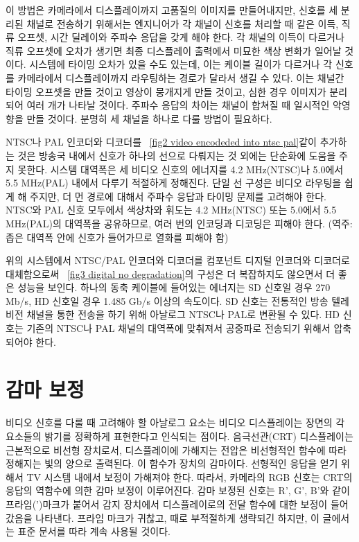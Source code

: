 이 방법은 카메라에서 디스플레이까지 고품질의 이미지를 만들어내지만, 신호를 세 분리된 채널로 전송하기 위해서는 엔지니어가 각 채널이 신호를 처리할 때 같은 이득, 직류 오프셋, 시간 딜레이와 주파수 응답을 갖게 해야 한다.
각 채널의 이득이 다르거나 직류 오프셋에 오차가 생기면 최종 디스플레이 출력에서 미묘한 색상 변화가 일어날 것이다.
시스템에 타이밍 오차가 있을 수도 있는데, 이는 케이블 길이가 다르거나 각 신호를 카메라에서 디스플레이까지 라우팅하는 경로가 달라서 생길 수 있다.
이는 채널간 타이밍 오프셋을 만들 것이고 영상이 뭉개지게 만들 것이고, 심한 경우 이미지가 분리되어 여러 개가 나타날 것이다.
주파수 응답의 차이는 채널이 합쳐질 때 일시적인 악영향을 만들 것이다.
분명히 세 채널을 하나로 다룰 방법이 필요하다.


NTSC나 PAL 인코더와 디코더를 \figurename~\ref{fig2 video encodeded into ntsc pal}\와 같이 추가하는 것은 방송국 내에서 신호가 하나의 선으로 다뤄지는 것 외에는 단순화에 도움을 주지 못한다.
시스템 대역폭은 세 비디오 신호의 에너지를 4.2 MHz(NTSC)나 5.0에서 5.5 MHz(PAL) 내에서 다루기 적절하게 정해진다.
단일 선 구성은 비디오 라우팅을 쉽게 해 주지만, 더 먼 경로에 대해서 주파수 응답과 타이밍 문제를 고려해야 한다.
NTSC와 PAL 신호 모두에서 색상차와 휘도는 4.2 MHz(NTSC) 또는 5.0에서 5.5 MHz(PAL)의 대역폭을 공유하므로, 여러 번의 인코딩과 디코딩은 피해야 한다.
(역주: 좁은 대역폭 안에 신호가 들어가므로 열화를 피해야 함)


위의 시스템에서 NTSC/PAL 인코더와 디코더를 컴포넌트 디지털 인코더와 디코더로 대체함으로써 \figurename~\ref{fig3 digital no degradation}의 구성은 더 복잡하지도 않으면서 더 좋은 성능을 보인다.
하나의 동축 케이블에 들어있는 에너지는 SD 신호일 경우 270 Mb/s, HD 신호일 경우 1.485 Gb/s 이상의 속도이다.
SD 신호는 전통적인 방송 텔레비전 채널을 통한 전송을 하기 위해 아날로그 NTSC나 PAL로 변환될 수 있다.
HD 신호는 기존의 NTSC나 PAL 채널의 대역폭에 맞춰져서 공중파로 전송되기 위해서 압축되어야 한다.

\section{감마 보정}
비디오 신호를 다룰 때 고려해야 할 아날로그 요소는 비디오 디스플레이는 장면의 각 요소들의 밝기를 정확하게 표현한다고 인식되는 점이다.
음극선관(CRT) 디스플레이는 근본적으로 비선형 장치로서, 디스플레이에 가해지는 전압은 비선형적인 함수에 따라 정해지는 빛의 양으로 출력된다.
이 함수가 장치의 감마이다. 선형적인 응답을 얻기 위해서 TV 시스템 내에서 보정이 가해져야 한다.
따라서, 카메라의 RGB 신호는 CRT의 응답의 역함수에 의한 감마 보정이 이루어진다. 감마 보정된 신호는 R', G', B'와 같이 프라임(')마크가 붙어서 감지 장치에서 디스플레이로의 전달 함수에 대한 보정이 들어갔음을 나타낸다.
프라임 마크가 귀찮고, 때로 부적절하게 생략되긴 하지만, 이 글에서는 표준 문서를 따라 계속 사용될 것이다.


